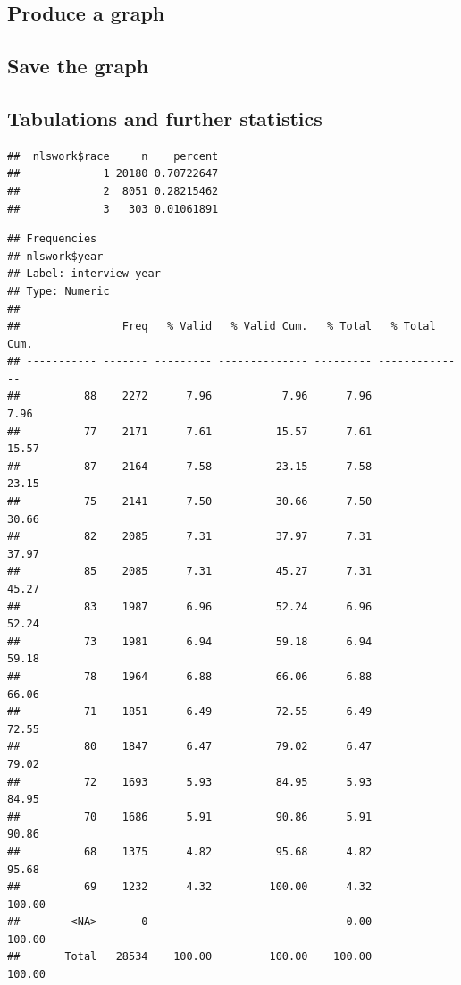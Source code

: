 \documentclass[
]{article}
\begin{document}
\hypertarget{produce-a-graph}{%
\subsection{Produce a graph}\label{produce-a-graph}}

\hypertarget{save-the-graph}{%
\subsection{Save the graph}\label{save-the-graph}}

\hypertarget{tabulations-and-further-statistics}{%
\subsection{Tabulations and further
statistics}\label{tabulations-and-further-statistics}}

\begin{verbatim}
##  nlswork$race     n    percent
##             1 20180 0.70722647
##             2  8051 0.28215462
##             3   303 0.01061891
\end{verbatim}

\begin{verbatim}
## Frequencies  
## nlswork$year  
## Label: interview year  
## Type: Numeric  
## 
##                Freq   % Valid   % Valid Cum.   % Total   % Total Cum.
## ----------- ------- --------- -------------- --------- --------------
##          88    2272      7.96           7.96      7.96           7.96
##          77    2171      7.61          15.57      7.61          15.57
##          87    2164      7.58          23.15      7.58          23.15
##          75    2141      7.50          30.66      7.50          30.66
##          82    2085      7.31          37.97      7.31          37.97
##          85    2085      7.31          45.27      7.31          45.27
##          83    1987      6.96          52.24      6.96          52.24
##          73    1981      6.94          59.18      6.94          59.18
##          78    1964      6.88          66.06      6.88          66.06
##          71    1851      6.49          72.55      6.49          72.55
##          80    1847      6.47          79.02      6.47          79.02
##          72    1693      5.93          84.95      5.93          84.95
##          70    1686      5.91          90.86      5.91          90.86
##          68    1375      4.82          95.68      4.82          95.68
##          69    1232      4.32         100.00      4.32         100.00
##        <NA>       0                               0.00         100.00
##       Total   28534    100.00         100.00    100.00         100.00
\end{verbatim}
\end{document}
